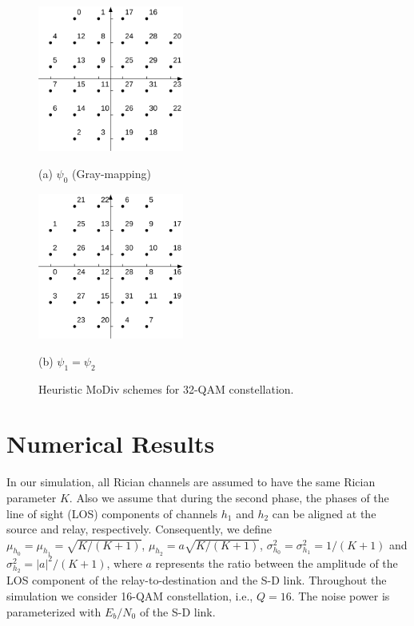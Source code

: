 \documentclass[journal,draftcls,onecolumn,12pt,twoside]{IEEEtran}
\begin{document}
\begin{figure}[!t]
    \begin{minipage}[b]{0.48\linewidth}
      \centering
      \centerline{\includegraphics[width=4.8cm]{./figs/gray32.eps}}
      \centerline{(a) $\psi_0$ (Gray-mapping)}\medskip
    \end{minipage}
    \hfill
    \begin{minipage}[b]{0.48\linewidth}
      \centering
      \centerline{\includegraphics[width=4.8cm]{./figs/karim32.eps}}
      \centerline{(b) $\psi_1=\psi_2$}\medskip
    \end{minipage}
    \caption{Heuristic MoDiv schemes for 32-QAM constellation.}
    \label{fig:heuristic32}
\end{figure}

\section{Numerical Results}
\label{sec:simulation}
In our simulation, all Rician channels are assumed to have the same Rician
parameter $K$. Also we assume that during the second phase, the phases of the
line of sight (LOS) components of channels $h_1$ and $h_2$ can be aligned at the
source and relay, respectively.
Consequently, we define $\mu_{h_0} = \mu_{h_1} = \sqrt{K/(K + 1)}$,
$\mu_{h_2}=a\sqrt{K/(K + 1)}$,  $\sigma_{h_0}^2 = \sigma_{h_1}^2 = 1/(K+1)$ and
$\sigma_{h_2}^2 = |a|^2/(K+1)$, where $a$ represents the ratio
between the amplitude of the LOS component of the
relay-to-destination and the S-D link. Throughout the
simulation we consider 16-QAM constellation, i.e.,  $Q=16$. The noise power is
parameterized with $E_b/N_0$ of the S-D link.
\end{document}
